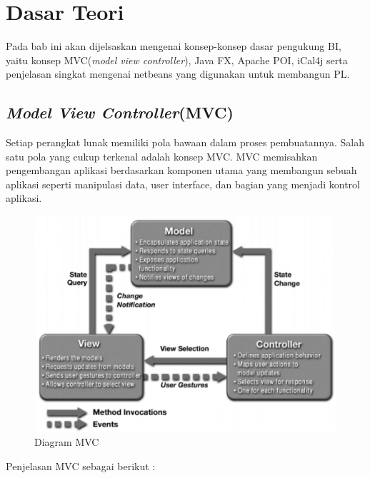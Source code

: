 \chapter{Dasar Teori}
\label{chap:definition}
Pada bab ini akan dijelsaskan mengenai konsep-konsep dasar pengukung BI, yaitu konsep MVC(\textit{model view controller}), Java FX, Apache POI, iCal4j serta penjelasan singkat mengenai netbeans yang digunakan untuk membangun PL.

\section{\textit{Model View Controller}(MVC)}
Setiap perangkat lunak memiliki pola bawaan dalam proses pembuatannya. Salah satu pola yang cukup terkenal adalah konsep MVC. MVC memisahkan pengembangan aplikasi berdasarkan komponen utama yang membangun sebuah aplikasi seperti manipulasi data, user interface, dan bagian yang menjadi kontrol aplikasi. 
\begin{figure}[h]
	\centering
	\includegraphics[scale=0.65]{Gambar/MVC}
	\caption{Diagram MVC}
	\end{figure}

Penjelasan MVC sebagai berikut \cite{Hans:2014}:

